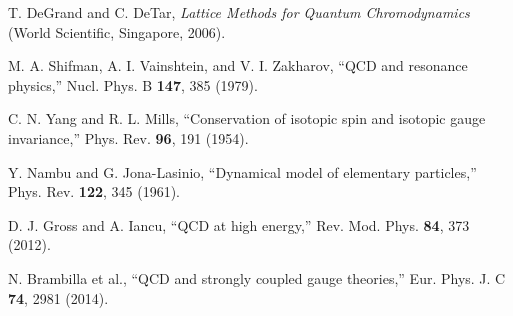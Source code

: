 \documentclass[12pt,a4paper]{article}
\begin{document}
\begin{thebibliography}{99}
 T. DeGrand and C. DeTar, \textit{Lattice Methods for Quantum Chromodynamics} (World Scientific, Singapore, 2006).

 M. A. Shifman, A. I. Vainshtein, and V. I. Zakharov, ``QCD and resonance physics,'' Nucl. Phys. B \textbf{147}, 385 (1979).

 C. N. Yang and R. L. Mills, ``Conservation of isotopic spin and isotopic gauge invariance,'' Phys. Rev. \textbf{96}, 191 (1954).

 Y. Nambu and G. Jona-Lasinio, ``Dynamical model of elementary particles,'' Phys. Rev. \textbf{122}, 345 (1961).

 D. J. Gross and A. Iancu, ``QCD at high energy,'' Rev. Mod. Phys. \textbf{84}, 373 (2012).

 N. Brambilla et al., ``QCD and strongly coupled gauge theories,'' Eur. Phys. J. C \textbf{74}, 2981 (2014).

\end{thebibliography}
\end{document}
